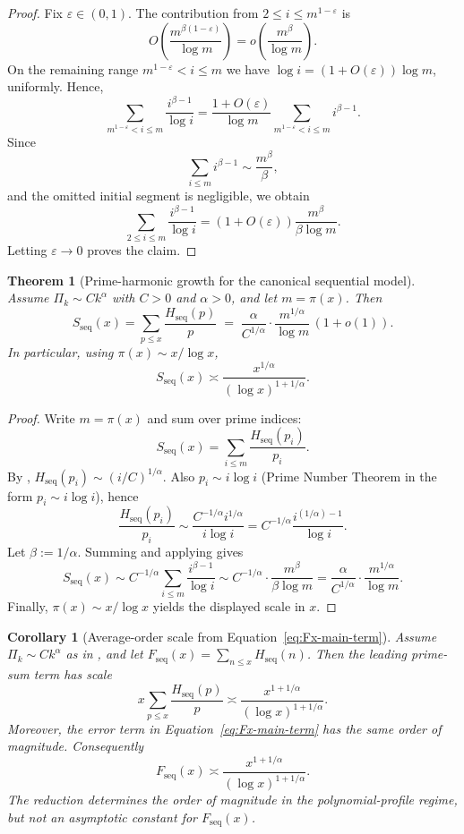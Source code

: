 \documentclass[11pt]{article}
\newtheorem{theorem}{Theorem}
\newtheorem{corollary}{Corollary}
\theoremstyle{definition}
\newcommand{\height}{H}
\begin{document}
\begin{proof}
Fix $\varepsilon\in(0,1)$.  The contribution from $2\le i\le m^{1-\varepsilon}$
is
\[
  O\!\left(\frac{m^{\beta(1-\varepsilon)}}{\log m}\right)
  =
  o\!\left(\frac{m^\beta}{\log m}\right).
\]
On the remaining range $m^{1-\varepsilon}<i\le m$ we have
$\log i=(1+O(\varepsilon))\log m$, uniformly.  Hence,
\[
\sum_{m^{1-\varepsilon}<i\le m}\frac{i^{\beta-1}}{\log i}
=
\frac{1+O(\varepsilon)}{\log m}
\sum_{m^{1-\varepsilon}<i\le m}i^{\beta-1}.
\]
Since
\[
  \sum_{i\le m}i^{\beta-1}\sim \frac{m^\beta}{\beta},
\]
and the omitted initial segment is negligible, we obtain
\[
  \sum_{2\le i\le m}\frac{i^{\beta-1}}{\log i}
  =
  (1+O(\varepsilon))
  \frac{m^\beta}{\beta\log m}.
\]
Letting $\varepsilon\to0$ proves the claim.
\end{proof}

\begin{theorem}[Prime-harmonic growth for the canonical sequential model]\label{thm:seq-prime-sum}
Assume $\Pi_k\sim Ck^\alpha$ with $C>0$ and $\alpha>0$, and let $m=\pi(x)$.
Then
\[
S_{\mathrm{seq}}(x)=\sum_{p\le x}\frac{\height_{\mathrm{seq}}(p)}{p}
\;=\;
\frac{\alpha}{C^{1/\alpha}}\cdot \frac{m^{1/\alpha}}{\log m}\,(1+o(1)).
\]
In particular, using $\pi(x)\sim x/\log x$,
\[
S_{\mathrm{seq}}(x)\asymp \frac{x^{1/\alpha}}{(\log x)^{1+1/\alpha}}.
\]
\end{theorem}

\begin{proof}
Write $m=\pi(x)$ and sum over prime indices:
\[
S_{\mathrm{seq}}(x)=\sum_{i\le m}\frac{\height_{\mathrm{seq}}(p_i)}{p_i}.
\]
By , $\height_{\mathrm{seq}}(p_i)\sim (i/C)^{1/\alpha}$.
Also $p_i\sim i\log i$ (Prime Number Theorem in the form $p_i\sim i\log i$), hence
\[
\frac{\height_{\mathrm{seq}}(p_i)}{p_i}
\sim
\frac{C^{-1/\alpha} i^{1/\alpha}}{i\log i}
=
C^{-1/\alpha}\frac{i^{(1/\alpha)-1}}{\log i}.
\]
Let $\beta:=1/\alpha$. Summing and applying  gives
\[
S_{\mathrm{seq}}(x)
\sim
C^{-1/\alpha}\sum_{i\le m}\frac{i^{\beta-1}}{\log i}
\sim
C^{-1/\alpha}\cdot \frac{m^\beta}{\beta\log m}
=
\frac{\alpha}{C^{1/\alpha}}\cdot\frac{m^{1/\alpha}}{\log m}.
\]
Finally, $\pi(x)\sim x/\log x$ yields the displayed scale in $x$.
\end{proof}

\begin{corollary}[Average-order scale from Equation~\eqref{eq:Fx-main-term}]
\label{cor:seq-avgorder-scale}
Assume $\Pi_k\sim Ck^\alpha$ as in , and let
$F_{\mathrm{seq}}(x)=\sum_{n\le x}\height_{\mathrm{seq}}(n)$.  Then the leading
prime-sum term has scale
\[
  x\sum_{p\le x}\frac{\height_{\mathrm{seq}}(p)}{p}
  \asymp
  \frac{x^{1+1/\alpha}}{(\log x)^{1+1/\alpha}}.
\]
Moreover, the error term in Equation~\eqref{eq:Fx-main-term} has the same order of
magnitude.  Consequently
\[
  F_{\mathrm{seq}}(x)
  \asymp
  \frac{x^{1+1/\alpha}}{(\log x)^{1+1/\alpha}}.
\]
The reduction determines the order of magnitude in the polynomial-profile
regime, but not an asymptotic constant for $F_{\mathrm{seq}}(x)$.
\end{corollary}
\end{document}
